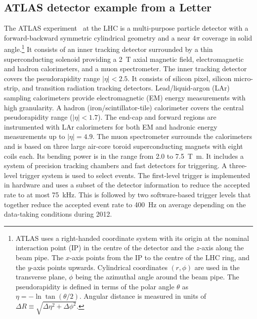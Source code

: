\newcommand{\AtlasCoordFootnote}{%
ATLAS uses a right-handed coordinate system with its origin at the nominal interaction point (IP)
in the centre of the detector and the $z$-axis along the beam pipe.
The $x$-axis points from the IP to the centre of the LHC ring,
and the $y$-axis points upwards.
Cylindrical coordinates $(r,\phi)$ are used in the transverse plane, 
$\phi$ being the azimuthal angle around the beam pipe.
The pseudorapidity is defined in terms of the polar angle $\theta$ as $\eta = -\ln \tan(\theta/2)$.
Angular distance is measured in units of $\Delta R \equiv \sqrt{\Delta\eta^{2} + \Delta\phi^{2}}$.}

\subsection{ATLAS detector example from a Letter}
\label{sec:atlas1}

The ATLAS experiment~\cite{atlas-detector} at the LHC is a multi-purpose particle detector
with a forward-backward symmetric cylindrical geometry and a near $4\pi$ coverage in 
solid angle.\footnote{\AtlasCoordFootnote}
It consists of an inner tracking detector surrounded by a thin superconducting solenoid
providing a \SI{2}{\tesla} axial magnetic field, electromagnetic and hadron calorimeters, and a muon spectrometer.
The inner tracking detector covers the pseudorapidity range $|\eta| < 2.5$.
It consists of silicon pixel, silicon micro-strip, and transition radiation tracking detectors.
Lead/liquid-argon (LAr) sampling calorimeters provide electromagnetic (EM) energy measurements
with high granularity.
A hadron (iron/scintillator-tile) calorimeter covers the central pseudorapidity range ($|\eta| < 1.7$).
The end-cap and forward regions are instrumented with LAr calorimeters
for both EM and hadronic energy measurements up to $|\eta| = 4.9$.
The muon spectrometer surrounds the calorimeters and is based on
three large air-core toroid superconducting magnets with eight coils each.
Its bending power is in the range from \num{2.0} to \SI{7.5}{\tesla\metre}.
It includes a system of precision tracking chambers and fast detectors for triggering.
A three-level trigger system is used to select events.
The first-level trigger is implemented in hardware and uses a subset of the detector information
to reduce the accepted rate to at most \SI{75}{\kilo\hertz}.
This is followed by two software-based trigger levels that
together reduce the accepted event rate to \SI{400}{\hertz} on average
depending on the data-taking conditions during 2012.


